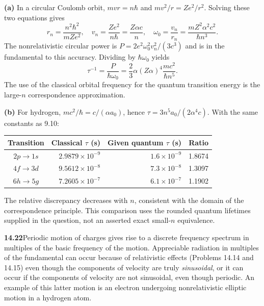 \textbf{(a)} In a circular Coulomb orbit, $mvr=n\hbar$ and
$mv^2/r=Ze^2/r^2$. Solving these two equations gives
\[
r_n=\frac{n^2\hbar^2}{mZe^2},\quad
v_n=\frac{Ze^2}{n\hbar}=\frac{Z\alpha c}{n},\quad
\omega_0=\frac{v_n}{r_n}
=\frac{mZ^2\alpha^2c^2}{\hbar n^3}.
\]
The nonrelativistic circular power is
$P=2e^2\omega_0^2v_n^2/(3c^3)$ and is in the fundamental to this
accuracy. Dividing by $\hbar\omega_0$ yields
\[
\boxed{\tau^{-1}=\frac P{\hbar\omega_0}
=\frac23\alpha(Z\alpha)^4\frac{mc^2}{\hbar n^5}.}
\]
The use of the classical orbital frequency for the quantum transition
energy is the large-$n$ correspondence approximation.

\textbf{(b)} For hydrogen, $mc^2/\hbar=c/(\alpha a_0)$, hence
$\tau=3n^5a_0/(2\alpha^4c)$. With the same constants as 9.10:
\begin{center}
\begin{tabular}{crrr}
\toprule
Transition&Classical $\tau$ (s)&Given quantum $\tau$ (s)&Ratio\\
\midrule
$2p\to1s$&$2.9879\times10^{-9}$&$1.6\times10^{-9}$&1.8674\\
$4f\to3d$&$9.5612\times10^{-8}$&$7.3\times10^{-8}$&1.3097\\
$6h\to5g$&$7.2605\times10^{-7}$&$6.1\times10^{-7}$&1.1902\\
\bottomrule
\end{tabular}
\end{center}
The relative discrepancy decreases with $n$, consistent with the domain
of the correspondence principle. This comparison uses the rounded
quantum lifetimes supplied in the question, not an asserted exact
small-$n$ equivalence.

\par\bigskip
\noindent\textbf{14.22}\quad Periodic motion of charges gives rise to a discrete frequency spectrum in multiples of the basic frequency of the motion. Appreciable radiation in multiples of the fundamental can occur because of relativistic effects (Problems 14.14 and 14.15) even though the components of velocity are truly \emph{sinusoidal}, or it can occur if the components of velocity are not sinusoidal, even though periodic. An example of this latter motion is an electron undergoing nonrelativistic elliptic motion in a hydrogen atom.

